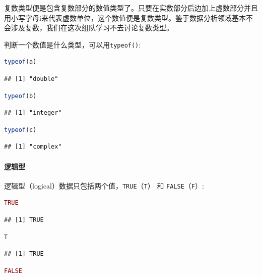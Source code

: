 \documentclass[]{ctexbook}
\let\oldparagraph\paragraph
\renewcommand{\paragraph}[1]{\oldparagraph{#1}\mbox{}}
\newcommand{\passthrough}[1]{#1}
\begin{document}
复数类型便是包含复数部分的数值类型了。只要在实数部分后边加上虚数部分并且用小写字母i来代表虚数单位，这个数值便是复数类型。鉴于数据分析领域基本不会涉及复数，我们在这次组队学习不去讨论复数类型。

判断一个数值是什么类型，可以用\passthrough{\lstinline!typeof()!}:

\begin{lstlisting}[language=R]
typeof(a)
\end{lstlisting}

\begin{lstlisting}
## [1] "double"
\end{lstlisting}

\begin{lstlisting}[language=R]
typeof(b)
\end{lstlisting}

\begin{lstlisting}
## [1] "integer"
\end{lstlisting}

\begin{lstlisting}[language=R]
typeof(c)
\end{lstlisting}

\begin{lstlisting}
## [1] "complex"
\end{lstlisting}

\hypertarget{ux903bux8f91ux578b}{%
\paragraph{逻辑型}\label{ux903bux8f91ux578b}}

逻辑型（logical）数据只包括两个值，\passthrough{\lstinline!TRUE!}（\passthrough{\lstinline!T!}） 和 \passthrough{\lstinline!FALSE!}（\passthrough{\lstinline!F!}）:

\begin{lstlisting}[language=R]
TRUE
\end{lstlisting}

\begin{lstlisting}
## [1] TRUE
\end{lstlisting}

\begin{lstlisting}[language=R]
T
\end{lstlisting}

\begin{lstlisting}
## [1] TRUE
\end{lstlisting}

\begin{lstlisting}[language=R]
FALSE
\end{lstlisting}
\end{document}

